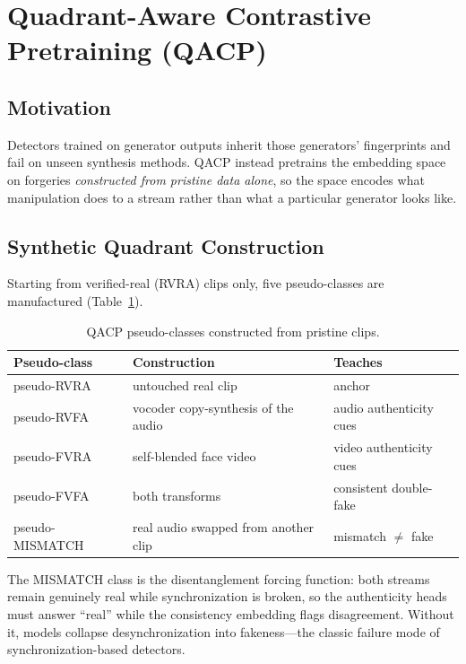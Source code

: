 \section{Quadrant-Aware Contrastive Pretraining (QACP)}
\label{sec:qacp}

\subsection{Motivation}
Detectors trained on generator outputs inherit those generators' fingerprints and
fail on unseen synthesis methods. QACP instead pretrains the embedding space on
forgeries \emph{constructed from pristine data alone}, so the space encodes what
manipulation does to a stream rather than what a particular generator looks like.

\subsection{Synthetic Quadrant Construction}
Starting from verified-real (RVRA) clips only, five pseudo-classes are
manufactured (Table~\ref{tab:qacp-classes}).

\begin{table}[h]
\centering
\caption{QACP pseudo-classes constructed from pristine clips.}
\label{tab:qacp-classes}
\small
\begin{tabular}{lll}
\toprule
\textbf{Pseudo-class} & \textbf{Construction} & \textbf{Teaches} \\
\midrule
pseudo-RVRA & untouched real clip & anchor \\
pseudo-RVFA & vocoder copy-synthesis of the audio & audio authenticity cues \\
pseudo-FVRA & self-blended face video~\cite{shiohara2022sbi} & video authenticity cues \\
pseudo-FVFA & both transforms & consistent double-fake \\
pseudo-MISMATCH & real audio swapped from another clip & mismatch $\neq$ fake \\
\bottomrule
\end{tabular}
\end{table}

The MISMATCH class is the disentanglement forcing function: both streams remain
genuinely real while synchronization is broken, so the authenticity heads must
answer ``real'' while the consistency embedding flags disagreement. Without it,
models collapse desynchronization into fakeness---the classic failure mode of
synchronization-based detectors.

